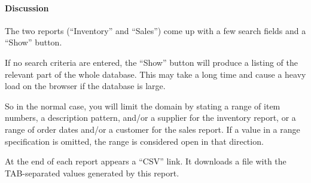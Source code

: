 \paragraph{Discussion}
\label{sec:appl-devel-reports-discussion}

The two reports (``Inventory'' and ``Sales'') come up with a few search
fields and a ``Show'' button.

If no search criteria are entered, the ``Show'' button will produce a
listing of the relevant part of the whole database. This may take a long
time and cause a heavy load on the browser if the database is large.

So in the normal case, you will limit the domain by stating a range of
item numbers, a description pattern, and/or a supplier for the inventory
report, or a range of order dates and/or a customer for the sales
report. If a value in a range specification is omitted, the range is
considered open in that direction.

At the end of each report appears a ``CSV'' link. It downloads a file with
the TAB-separated values generated by this report.


